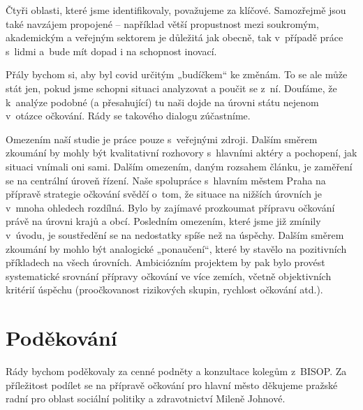 Čtyři oblasti, které jsme identifikovaly, považujeme za klíčové. Samozřejmě jsou také navzájem propojené -- například větší propustnost mezi soukromým, akademickým a veřejným sektorem je důležitá jak obecně, tak v~případě práce s~lidmi a~bude mít dopad i na schopnost inovací.

Přály bychom si, aby byl covid určitým „budíčkem“ ke změnám. To se ale může stát jen, pokud jsme schopni situaci analyzovat a poučit se z~ní. Doufáme, že k~analýze podobné (a přesahující) tu naši dojde na úrovni státu nejenom v~otázce očkování. Rády se takového dialogu zúčastníme.

Omezením naší studie je práce pouze s~veřejnými zdroji. Dalším směrem zkoumání by mohly být kvalitativní rozhovory s~hlavními aktéry a pochopení, jak situaci vnímali oni sami. Dalším omezením, daným rozsahem článku, je zaměření se na centrální úroveň řízení. Naše spolupráce s~hlavním městem Praha na přípravě strategie očkování \cite{hygienicka_stanice_praha_2021} svědčí o~tom, že situace na nižších úrovních je v~mnoha ohledech rozdílná. Bylo by zajímavé prozkoumat přípravu očkování právě na úrovni krajů a obcí. Posledním omezením, které jsme již zmínily v~úvodu, je soustředění se na nedostatky spíše než na úspěchy. Dalším směrem zkoumání by mohlo být analogické „ponaučení“, které by stavělo na pozitivních příkladech na všech úrovních. Ambiciózním projektem by pak bylo provést systematické srovnání přípravy očkování ve více zemích, včetně objektivních kritérií úspěchu (proočkovanost rizikových skupin, rychlost očkování atd.).

\section*{Poděkování}

Rády bychom poděkovaly za cenné podněty a konzultace kolegům z~BISOP.
Za příležitost podílet se na přípravě očkování pro hlavní město děkujeme pražské radní pro oblast sociální politiky a zdravotnictví Mileně Johnové.


